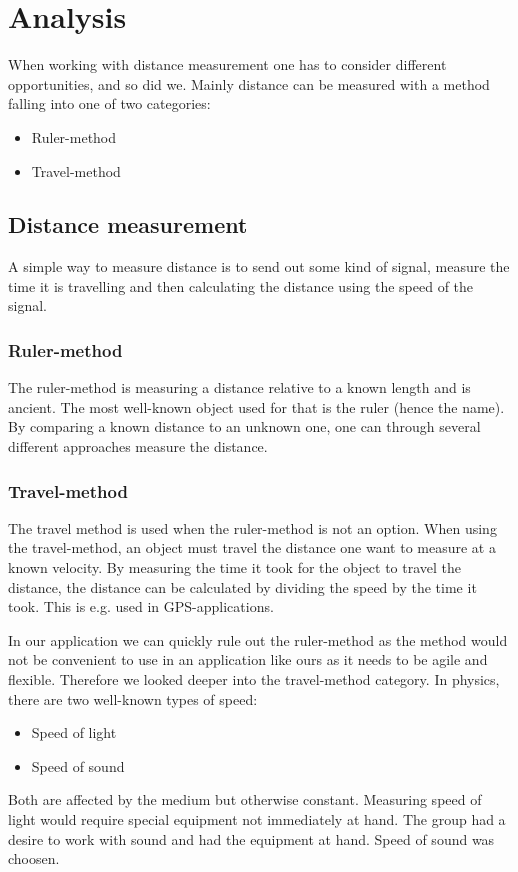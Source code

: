 \chapter{Analysis}
When working with distance measurement one has to consider different opportunities, and so did we.
Mainly distance can be measured with a method falling into one of two categories:
\begin{itemize}
\item Ruler-method
\item Travel-method
\end{itemize}
\section{Distance measurement}
A simple way to measure distance is to send out some kind of signal, measure the time it is travelling and then calculating the distance using the speed of the signal.
\subsection{Ruler-method}
The ruler-method is measuring a distance relative to a known length and is ancient. The most well-known object used for that is the ruler (hence the name). By comparing a known distance to an unknown one, one can through several different approaches measure the distance.

\subsection{Travel-method}
The travel method is used when the ruler-method is not an option. When using the travel-method, an object must travel the distance one want to measure at a known velocity. By measuring the time it took for the object to travel the distance, the distance can be calculated by dividing the speed by the time it took. This is e.g. used in GPS-applications.

In our application we can quickly rule out the ruler-method as the method would not be convenient to use in an application like ours as it needs to be agile and flexible. Therefore we looked deeper into the travel-method category.
In physics, there are two well-known types of speed: 
\begin{itemize}
\item Speed of light
\item Speed of sound
\end{itemize}
Both are affected by the medium but otherwise constant. Measuring speed of light would require special equipment not immediately at hand. The group had a desire to work with sound and had the equipment at hand. Speed of sound was choosen.


